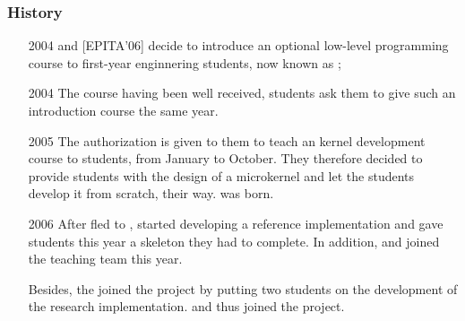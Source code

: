 \begin{frame}
  \frametitle{History}

  \begin{itemize}
    \item[2004]
       and  [EPITA'06] decide
      to introduce an optional low-level programming course to first-year
      enginnering students, now known as ;
    \item[2004]
      The course having been well received,  students ask them to give such an introduction course the
      same year.
    \item[2005]
      The authorization is given to them to teach an kernel development course
      to  students, from January to October. They therefore decided
      to provide students with the design of a microkernel and let the students
      develop it from scratch, their way.  was born.
    \item[2006]
      After  fled to ,  started developing a reference implementation and gave
      students this year a skeleton they had to complete. In addition,
       and  joined the teaching
      team this year.

      \-

      Besides, the  joined the project
      by putting two students on the development of the 
      research implementation.  and  thus joined the project.
  \end{itemize}
\end{frame}


